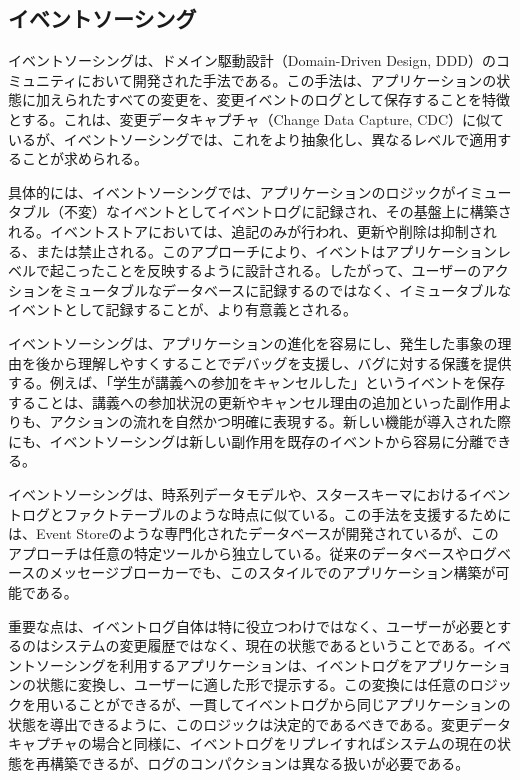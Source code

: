 \documentclass[../../../main]{subfiles}
\begin{document}
    \subsection{イベントソーシング}\label{subsec:phraseology-event_sourcing}
    イベントソーシングは、ドメイン駆動設計（Domain-Driven Design, DDD）のコミュニティにおいて開発された手法である。この手法は、アプリケーションの状態に加えられたすべての変更を、変更イベントのログとして保存することを特徴とする。これは、変更データキャプチャ（Change Data Capture, CDC）に似ているが、イベントソーシングでは、これをより抽象化し、異なるレベルで適用することが求められる。

    具体的には、イベントソーシングでは、アプリケーションのロジックがイミュータブル（不変）なイベントとしてイベントログに記録され、その基盤上に構築される。イベントストアにおいては、追記のみが行われ、更新や削除は抑制される、または禁止される。このアプローチにより、イベントはアプリケーションレベルで起こったことを反映するように設計される。したがって、ユーザーのアクションをミュータブルなデータベースに記録するのではなく、イミュータブルなイベントとして記録することが、より有意義とされる。

    イベントソーシングは、アプリケーションの進化を容易にし、発生した事象の理由を後から理解しやすくすることでデバッグを支援し、バグに対する保護を提供する。例えば、「学生が講義への参加をキャンセルした」というイベントを保存することは、講義への参加状況の更新やキャンセル理由の追加といった副作用よりも、アクションの流れを自然かつ明確に表現する。新しい機能が導入された際にも、イベントソーシングは新しい副作用を既存のイベントから容易に分離できる。

    イベントソーシングは、時系列データモデルや、スタースキーマにおけるイベントログとファクトテーブルのような時点に似ている。この手法を支援するためには、Event Storeのような専門化されたデータベースが開発されているが、このアプローチは任意の特定ツールから独立している。従来のデータベースやログベースのメッセージブローカーでも、このスタイルでのアプリケーション構築が可能である。

    重要な点は、イベントログ自体は特に役立つわけではなく、ユーザーが必要とするのはシステムの変更履歴ではなく、現在の状態であるということである。イベントソーシングを利用するアプリケーションは、イベントログをアプリケーションの状態に変換し、ユーザーに適した形で提示する。この変換には任意のロジックを用いることができるが、一貫してイベントログから同じアプリケーションの状態を導出できるように、このロジックは決定的であるべきである。変更データキャプチャの場合と同様に、イベントログをリプレイすればシステムの現在の状態を再構築できるが、ログのコンパクションは異なる扱いが必要である。
\end{document}
